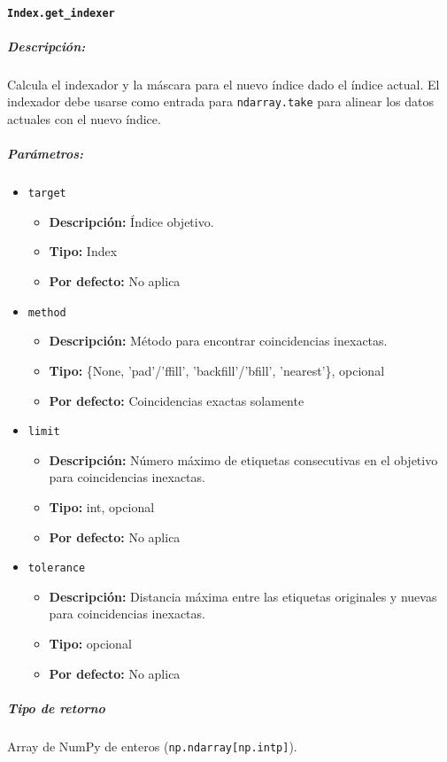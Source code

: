 \paragraph{\texttt{Index.get\_indexer}}
\subparagraph{Descripción:}
Calcula el indexador y la máscara para el nuevo índice dado el índice actual. El indexador debe usarse como entrada para \texttt{ndarray.take} para alinear los datos actuales con el nuevo índice.
\subparagraph{Parámetros:}
\begin{itemize}
\item \texttt{target}
\begin{itemize}
\item \textbf{Descripción:} Índice objetivo.
\item \textbf{Tipo:} Index
\item \textbf{Por defecto:} No aplica
\end{itemize}
\item \texttt{method}
\begin{itemize}
\item \textbf{Descripción:} Método para encontrar coincidencias inexactas.
\item \textbf{Tipo:} \{None, 'pad'/'ffill', 'backfill'/'bfill', 'nearest'\}, opcional
\item \textbf{Por defecto:} Coincidencias exactas solamente
\end{itemize}
\item \texttt{limit}
\begin{itemize}
\item \textbf{Descripción:} Número máximo de etiquetas consecutivas en el objetivo para coincidencias inexactas.
\item \textbf{Tipo:} int, opcional
\item \textbf{Por defecto:} No aplica
\end{itemize}
\item \texttt{tolerance}
\begin{itemize}
\item \textbf{Descripción:} Distancia máxima entre las etiquetas originales y nuevas para coincidencias inexactas.
\item \textbf{Tipo:} opcional
\item \textbf{Por defecto:} No aplica
\end{itemize}
\end{itemize}
\subparagraph{Tipo de retorno}
Array de NumPy de enteros (\texttt{np.ndarray[np.intp]}).
